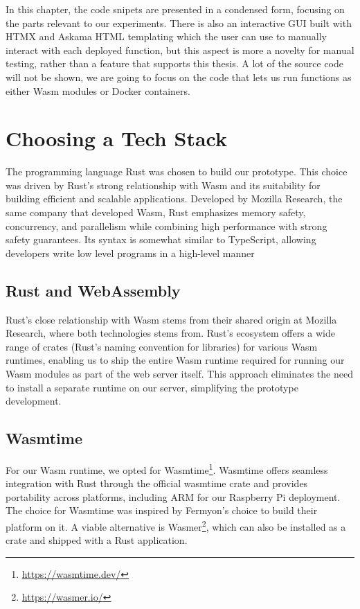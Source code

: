 \documentclass[
  table]{report}
\begin{document}
In this chapter, the code snipets are presented in a condensed form,
focusing on the parts relevant to our experiments. There is also an
interactive GUI built with HTMX and Askama HTML templating which the
user can use to manually interact with each deployed function, but this
aspect is more a novelty for manual testing, rather than a feature that
supports this thesis. A lot of the source code will not be shown, we are
going to focus on the code that lets us run functions as either
\ac{Wasm} modules or Docker containers.

\section{Choosing a Tech Stack}
\label{sect:tech_stack}

The programming language Rust was chosen to build our prototype. This
choice was driven by Rust's strong relationship with \ac{Wasm} and its
suitability for building efficient and scalable applications. Developed
by Mozilla Research, the same company that developed \ac{Wasm}, Rust
emphasizes memory safety, concurrency, and parallelism while combining
high performance with strong safety guarantees. Its syntax is somewhat
similar to TypeScript, allowing developers write low level programs in a
high-level manner

\subsection{Rust and WebAssembly}
\label{sect:rust_and_wasm}

Rust's close relationship with \ac{Wasm} stems from their shared origin
at Mozilla Research, where both technologies stems from. Rust's
ecosystem offers a wide range of crates (Rust's naming convention for
libraries) for various \ac{Wasm} runtimes, enabling us to ship the
entire Wasm runtime required for running our Wasm modules as part of the
web server itself. This approach eliminates the need to install a
separate runtime on our server, simplifying the prototype development.

\subsection{Wasmtime}

For our \ac{Wasm} runtime, we opted for Wasmtime\footnote{\url{https://wasmtime.dev/}}.
Wasmtime offers seamless integration with Rust through the official
wasmtime crate and provides portability across platforms, including ARM
for our Raspberry Pi deployment. The choice for Wasmtime was inspired by
Fermyon's choice to build their platform on it. A viable alternative is
Wasmer\footnote{\url{https://wasmer.io/}}, which can also be installed
as a crate and shipped with a Rust application.
\end{document}
